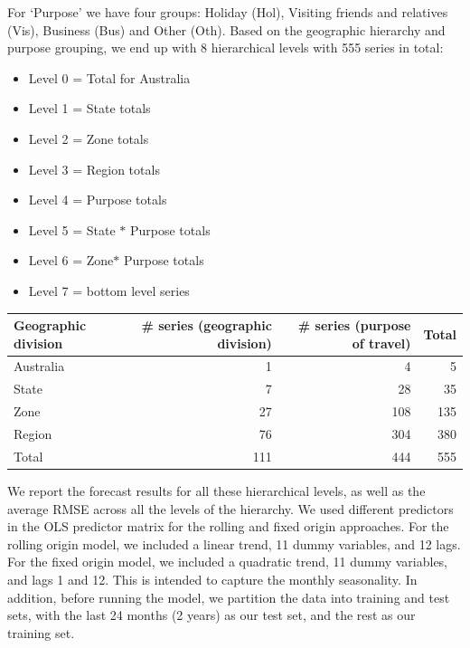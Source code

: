 \documentclass[11pt,a4paper,]{article}
\providecommand{\tightlist}{%
  \setlength{\itemsep}{0pt}\setlength{\parskip}{0pt}}
\let\origtable\table
\let\endorigtable\endtable
\renewenvironment{table}[1][2] {
    \expandafter\origtable\expandafter[!htbp]
} {
    \endorigtable
}
\begin{document}
For `Purpose' we have four groups: Holiday (Hol), Visiting friends and
relatives (Vis), Business (Bus) and Other (Oth). Based on the geographic
hierarchy and purpose grouping, we end up with 8 hierarchical levels
with 555 series in total:

\begin{itemize}
\tightlist
\item
  Level 0 = Total for Australia
\item
  Level 1 = State totals
\item
  Level 2 = Zone totals
\item
  Level 3 = Region totals
\item
  Level 4 = Purpose totals
\item
  Level 5 = State \(*\) Purpose totals
\item
  Level 6 = Zone\(*\) Purpose totals
\item
  Level 7 = bottom level series
\end{itemize}

\begin{table}[!h]

\caption{\label{tab:Australiageographicalpurposedivision}Number of Australian domestic tourism series in each level of the hierarchy and group structure.}
\centering
\begin{tabular}{lrrr}
\toprule
Geographic division & \# series (geographic division) & \# series (purpose of travel) & Total\\
\midrule
Australia & 1 & 4 & 5\\
State & 7 & 28 & 35\\
Zone & 27 & 108 & 135\\
Region & 76 & 304 & 380\\
\hline
Total & 111 & 444 & 555\\
\bottomrule
\end{tabular}
\end{table}

We report the forecast results for all these hierarchical levels, as
well as the average RMSE across all the levels of the hierarchy. We used
different predictors in the OLS predictor matrix for the rolling and
fixed origin approaches. For the rolling origin model, we included a
linear trend, 11 dummy variables, and 12 lags. For the fixed origin
model, we included a quadratic trend, 11 dummy variables, and lags 1 and
12. This is intended to capture the monthly seasonality. In addition,
before running the model, we partition the data into training and test
sets, with the last 24 months (2 years) as our test set, and the rest as
our training set.
\end{document}
